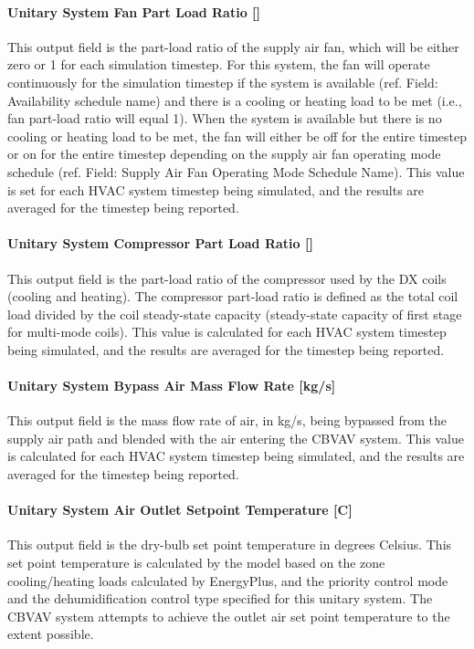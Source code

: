 \paragraph{Unitary System Fan Part Load Ratio {[]}}\label{unitary-system-fan-part-load-ratio-8}

This output field is the part-load ratio of the supply air fan, which will be either zero or 1 for each simulation timestep. For this system, the fan will operate continuously for the simulation timestep if the system is available (ref. Field: Availability schedule name) and there is a cooling or heating load to be met (i.e., fan part-load ratio will equal 1). When the system is available but there is no cooling or heating load to be met, the fan will either be off for the entire timestep or on for the entire timestep depending on the supply air fan operating mode schedule (ref. Field: Supply Air Fan Operating Mode Schedule Name). This value is set for each HVAC system timestep being simulated, and the results are averaged for the timestep being reported.

\paragraph{Unitary System Compressor Part Load Ratio {[]}}\label{unitary-system-compressor-part-load-ratio-5}

This output field is the part-load ratio of the compressor used by the DX coils (cooling and heating). The compressor part-load ratio is defined as the total coil load divided by the coil steady-state capacity (steady-state capacity of first stage for multi-mode coils). This value is calculated for each HVAC system timestep being simulated, and the results are averaged for the timestep being reported.

\paragraph{Unitary System Bypass Air Mass Flow Rate {[}kg/s{]}}\label{unitary-system-bypass-air-mass-flow-rate-kgs}

This output field is the mass flow rate of air, in kg/s, being bypassed from the supply air path and blended with the air entering the CBVAV system. This value is calculated for each HVAC system timestep being simulated, and the results are averaged for the timestep being reported.

\paragraph{Unitary System Air Outlet Setpoint Temperature {[}C{]}}\label{unitary-system-air-outlet-setpoint-temperature-c}

This output field is the dry-bulb set point temperature in degrees Celsius. This set point temperature is calculated by the model based on the zone cooling/heating loads calculated by EnergyPlus, and the priority control mode and the dehumidification control type specified for this unitary system. The CBVAV system attempts to achieve the outlet air set point temperature to the extent possible.
